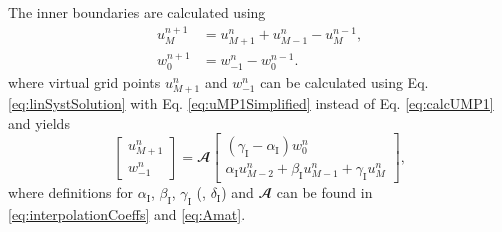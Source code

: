 \documentclass[dvipsnames, reprint]{JASA}
\begin{document}
The inner boundaries are calculated using
\begin{align}
    u_M^{n+1} &= u_{M+1}^n + u_{M-1}^n - u_M^{n-1},\\
    w_0^{n+1} &= w_{-1}^n - w_0^{n-1}.
\end{align}
where virtual grid points $u_{M+1}^n$ and $w_{-1}^n$ can be calculated using Eq. \eqref{eq:linSystSolution} with Eq. \eqref{eq:uMP1Simplified} instead of Eq. \eqref{eq:calcUMP1} and yields
\begin{equation}\label{eq:calcVirtualGridPoints}
    \begin{bmatrix}
    u_{M+1}^n \\
    w_{-1}^n
    \end{bmatrix}
    =
    \mathbfcal{A}
    \begin{bmatrix}
    (\gamma_\text{I}-\alpha_\text{I}) w_0^n \\
    \alpha_\text{I} u_{M-2}^n + \beta_\text{I}u_{M-1}^n + \gamma_\text{I} u_{M}^n
    \end{bmatrix},
\end{equation}
where definitions for  $\alpha_\text{I}$, $\beta_\text{I}$, $\gamma_\text{I}$ (, $\delta_\text{I}$) and $\mathbfcal{A}$ can be found in \eqref{eq:interpolationCoeffs} and \eqref{eq:Amat}.
\end{document}
